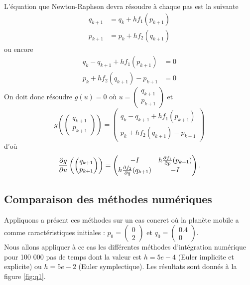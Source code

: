 L'équation que Newton-Raphson devra résoudre à chaque pas est la suivante
\begin{align*}
  q_{k+1} & = q_k + hf_1(p_{k+1})\\
  p_{k+1} & = p_k + hf_2(q_{k+1})
\end{align*}
ou encore
\begin{align*}
  q_k - q_{k+1} + hf_1(p_{k+1}) & = 0\\
  p_k + hf_2(q_{k+1}) - p_{k+1} & = 0
\end{align*}
On doit donc résoudre $g(u) = 0$ où
$u =
\begin{pmatrix}
  q_{k+1}\\
  p_{k+1}
\end{pmatrix}$
et
\[
  g
  \left(
    \begin{pmatrix}
      q_{k+1}\\
      p_{k+1}
    \end{pmatrix}
  \right) =
  \begin{pmatrix}
    q_k - q_{k+1} + hf_1(p_{k+1})\\
    p_k + hf_2(q_{k+1}) - p_{k+1}
  \end{pmatrix}
\]
d'où
\[
  \frac{\partial g}{\partial u}
  \left(
    \begin{pmatrix}
      q_{k+1}\\
      p_{k+1}
    \end{pmatrix}
  \right) =
  \begin{pmatrix}
    -I & h\frac{\partial f_1}{\partial p}(p_{k+1})\\
    h\frac{\partial f_2}{\partial q}(q_{k+1}) & -I
  \end{pmatrix}.
\]


\subsection{Comparaison des méthodes numériques}

Appliquons a présent ces méthodes sur un cas concret où la planète mobile a comme caractéristiques initiales : $p_0 = \begin{pmatrix}
0\\
2
\end{pmatrix}
$ et $q_0 = \begin{pmatrix}
0.4\\
0
\end{pmatrix} 
$.\\

Nous allons appliquer à ce cas les différentes méthodes d'intégration numérique pour 100 000 pas de temps dont la valeur est $h=5e-4$ (Euler implicite et explicite) ou $h=5e-2$ (Euler symplectique). Les résultats sont donnés à la figure \ref{fig:q1}.


